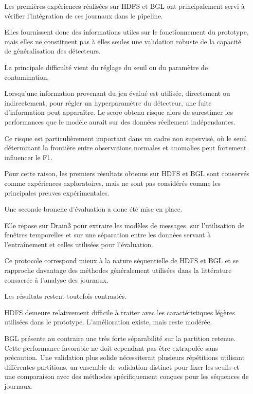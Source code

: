 Les premières expériences réalisées sur HDFS et BGL ont principalement servi à vérifier l'intégration de ces journaux dans le pipeline.

Elles fournissent donc des informations utiles sur le fonctionnement du prototype, mais elles ne constituent pas à elles seules une validation robuste de la capacité de généralisation des détecteurs.

La principale difficulté vient du réglage du seuil ou du paramètre de contamination.

Lorsqu'une information provenant du jeu évalué est utilisée, directement ou indirectement, pour régler un hyperparamètre du détecteur, une fuite d'information peut apparaître. Le score obtenu risque alors de surestimer les performances que le modèle aurait sur des données réellement indépendantes.

Ce risque est particulièrement important dans un cadre non supervisé, où le seuil déterminant la frontière entre observations normales et anomalies peut fortement influencer le F1.

Pour cette raison, les premiers résultats obtenus sur HDFS et BGL sont conservés comme expériences exploratoires, mais ne sont pas considérés comme les principales preuves expérimentales.

Une seconde branche d'évaluation a donc été mise en place.

Elle repose sur Drain3 pour extraire les modèles de messages, sur l'utilisation de fenêtres temporelles et sur une séparation entre les données servant à l'entraînement et celles utilisées pour l'évaluation.

Ce protocole correspond mieux à la nature séquentielle de HDFS et BGL et se rapproche davantage des méthodes généralement utilisées dans la littérature consacrée à l'analyse des journaux.

Les résultats restent toutefois contrastés.

HDFS demeure relativement difficile à traiter avec les caractéristiques légères utilisées dans le prototype. L'amélioration existe, mais reste modérée.

BGL présente au contraire une très forte séparabilité sur la partition retenue. Cette performance favorable ne doit cependant pas être extrapolée sans précaution. Une validation plus solide nécessiterait plusieurs répétitions utilisant différentes partitions, un ensemble de validation distinct pour fixer les seuils et une comparaison avec des méthodes spécifiquement conçues pour les séquences de journaux.

